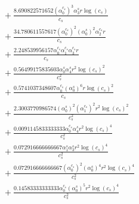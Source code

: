 \documentclass[10pt]{article}
\begin{document}
\begin{align*}
&{}  + \frac{8.690822571652 \left(\alpha_{0}^{c_s}\right)^{3} \alpha_{3}^s r \log{\left(c_{s} \right)}}{c_{s}} \\
&{}  + \frac{34.780611557617 \left(\alpha_{0}^{c_s}\right)^{2} \left(\alpha_{0}^s\right)^{2} \alpha_{2}^{c_s} r}{c_{s}} \\
&{}  + \frac{2.248539956157 \alpha_{0}^{c_s} \alpha_{1}^{c_s} \alpha_{3}^{c_s} r}{c_{s}} \\
&{}  + \frac{0.56499175835603 \alpha_{0}^s \alpha_{4}^s r^{2} \log{\left(c_{s} \right)}^{2}}{c_{s}^{2}} \\
&{}  + \frac{0.5741037348607 \alpha_{0}^{c_s} \left(\alpha_{0}^s\right)^{6} r \log{\left(c_{s} \right)}^{2}}{c_{s}} \\
&{}  + \frac{2.3003770986574 \left(\alpha_{0}^s\right)^{2} \left(\alpha_{1}^{c_s}\right)^{2} r^{2} \log{\left(c_{s} \right)}^{2}}{c_{s}^{2}} \\
&{}  + \frac{0.0091145833333333 \alpha_{0}^{c_s} \alpha_{4}^s r^{2} \log{\left(c_{s} \right)}^{4}}{c_{s}^{2}} \\
&{}  + \frac{0.072916666666667 \alpha_{1}^s \alpha_{3}^s r^{2} \log{\left(c_{s} \right)}^{4}}{c_{s}^{2}} \\
&{}  + \frac{0.072916666666667 \left(\alpha_{0}^{c_s}\right)^{2} \left(\alpha_{0}^s\right)^{4} r^{2} \log{\left(c_{s} \right)}^{4}}{c_{s}^{2}} \\
&{}  + \frac{0.14583333333333 \alpha_{0}^{c_s} \left(\alpha_{0}^s\right)^{5} r^{2} \log{\left(c_{s} \right)}^{4}}{c_{s}^{2}}
\end{align*}
\end{document}
